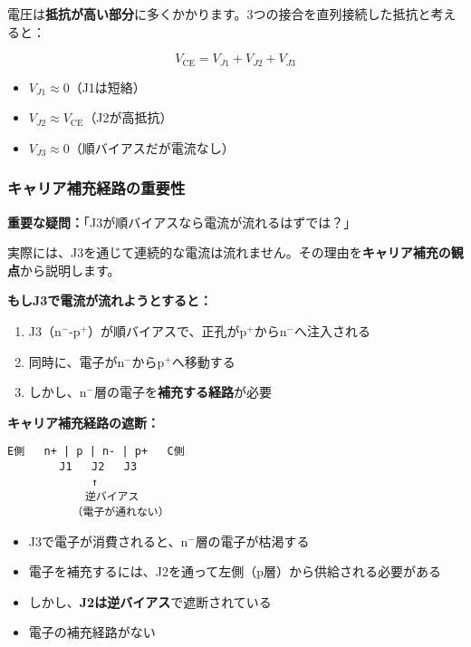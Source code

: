 電圧は\textbf{抵抗が高い部分}に多くかかります。3つの接合を直列接続した抵抗と考えると：

\begin{equation}
V_{\text{CE}} = V_{J1} + V_{J2} + V_{J3}
\end{equation}

\begin{itemize}
\item $V_{J1} \approx 0$（J1は短絡）
\item $V_{J2} \approx V_{\text{CE}}$（J2が高抵抗）
\item $V_{J3} \approx 0$（順バイアスだが電流なし）
\end{itemize}

\subsubsection{キャリア補充経路の重要性}

\textbf{重要な疑問：}「J3が順バイアスなら電流が流れるはずでは？」

実際には、J3を通じて連続的な電流は流れません。その理由を\textbf{キャリア補充の観点}から説明します。

\textbf{もしJ3で電流が流れようとすると：}

\begin{enumerate}
\item J3（n$^-$-p$^+$）が順バイアスで、正孔がp$^+$からn$^-$へ注入される
\item 同時に、電子がn$^-$からp$^+$へ移動する
\item しかし、n$^-$層の電子を\textbf{補充する経路}が必要
\end{enumerate}

\textbf{キャリア補充経路の遮断：}

\begin{verbatim}
E側   n+ | p | n- | p+   C側
        J1   J2   J3
             ↑
            逆バイアス
          （電子が通れない）
\end{verbatim}

\begin{itemize}
\item J3で電子が消費されると、n$^-$層の電子が枯渇する
\item 電子を補充するには、J2を通って左側（p層）から供給される必要がある
\item しかし、\textbf{J2は逆バイアス}で遮断されている
\item 電子の補充経路がない
\end{itemize}

